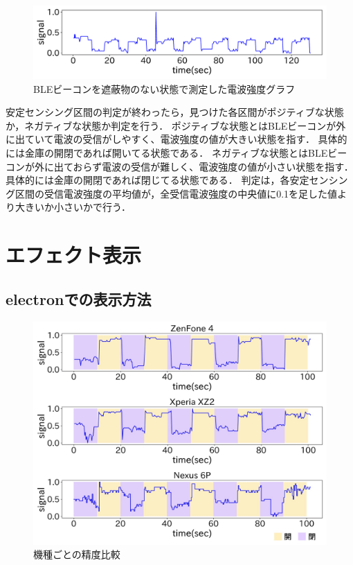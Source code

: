 \begin{figure}[tbh]
    \centering
    \includegraphics[width=14cm]{images/chapter3/bokoboko.pdf}
    \caption{BLEビーコンを遮蔽物のない状態で測定した電波強度グラフ}
    \label{nomal-data}
\end{figure}

安定センシング区間の判定が終わったら，見つけた各区間がポジティブな状態か，ネガティブな状態か判定を行う．
ポジティブな状態とはBLEビーコンが外に出ていて電波の受信がしやすく、電波強度の値が大きい状態を指す．
具体的には金庫の開閉であれば開いてる状態である．
ネガティブな状態とはBLEビーコンが外に出ておらず電波の受信が難しく、電波強度の値が小さい状態を指す．
具体的には金庫の開閉であれば閉じてる状態である．
判定は，各安定センシング区間の受信電波強度の平均値が，全受信電波強度の中央値に0.1を足した値より大きいか小さいかで行う．


\section{エフェクト表示}



\subsection{electronでの表示方法}

\begin{figure}[tbh]
    \centering
    \includegraphics[width=14cm]{images/chapter3/mix.jpg}
    \caption{機種ごとの精度比較}
    \label{multi-data}
\end{figure}

